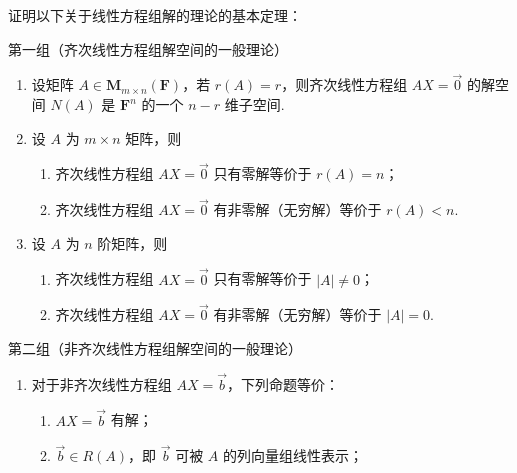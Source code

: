 \begin{exercise}

    \begin{exgroup}
        \item 证明以下关于线性方程组解的理论的基本定理：

        第一组（齐次线性方程组解空间的一般理论）
        \begin{enumerate}
            \item 设矩阵 $A \in \mathbf{M}_{m\times n}(\mathbf{F})$，若 $r(A)=r$，则齐次线性方程组 $AX=\vec{0}$ 的解空间 $N(A)$ 是 $\mathbf{F}^n$ 的一个 $n-r$ 维子空间.

            \item 设 $A$ 为 $m \times n$ 矩阵，则
                  \begin{enumerate}
                      \item 齐次线性方程组 $AX=\vec{0}$ 只有零解等价于 $r(A)=n$；

                      \item 齐次线性方程组 $AX=\vec{0}$ 有非零解（无穷解）等价于 $r(A)<n$.
                  \end{enumerate}

            \item 设 $A$ 为 $n$ 阶矩阵，则
                  \begin{enumerate}
                      \item 齐次线性方程组 $AX=\vec{0}$ 只有零解等价于 $|A|\neq 0$；

                      \item 齐次线性方程组 $AX=\vec{0}$ 有非零解（无穷解）等价于 $|A|=0$.
                  \end{enumerate}
        \end{enumerate}

        第二组（非齐次线性方程组解空间的一般理论）
        \begin{enumerate}[resume*]
            \item 对于非齐次线性方程组 $AX=\vec{b}$，下列命题等价：
                  \begin{enumerate}
                      \item $AX=\vec{b}$ 有解；

                      \item $\vec{b} \in R(A)$，即 $\vec{b}$ 可被 $A$ 的列向量组线性表示；


\end{enumerate}
\end{enumerate}
\end{exgroup}
\end{exercise}

